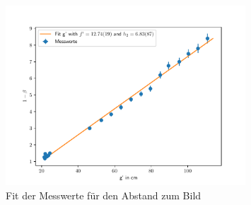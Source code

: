 \documentclass[11pt, a4paper]{article}
\begin{document}
    \begin{figure}[h]
        \centering
        \includegraphics[width=0.8\textwidth]{g_prime.pdf}
        \caption{Fit der Messwerte für den Abstand zum Bild}
        \label{fig:fit2}
    \end{figure}

\end{document}
